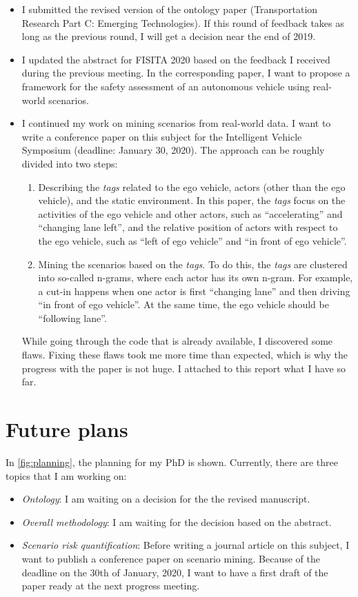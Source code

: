 \documentclass[10pt,final,a4paper,oneside,onecolumn]{article}
\begin{document}
\begin{itemize}
	\item I submitted the revised version of the ontology paper (Transportation Research Part C: Emerging Technologies). If this round of feedback takes as long as the previous round, I will get a decision near the end of 2019.
	\item I updated the abstract for FISITA 2020 based on the feedback I received during the previous meeting. In the corresponding paper, I want to propose a framework for the safety assessment of an autonomous vehicle using real-world scenarios.
	\item I continued my work on mining scenarios from real-world data. I want to write a conference paper on this subject for the Intelligent Vehicle Symposium (deadline: January 30, 2020). The approach can be roughly divided into two steps:
	\begin{enumerate}
		\item Describing the \emph{tags} related to the ego vehicle, actors (other than the ego vehicle), and the static environment. In this paper, the \emph{tags} focus on the activities of the ego vehicle and other actors, such as ``accelerating'' and ``changing lane left'', and the relative position of actors with respect to the ego vehicle, such as ``left of ego vehicle'' and ``in front of ego vehicle''.
		\item Mining the scenarios based on the \emph{tags}. To do this, the \emph{tags} are clustered into so-called n-grams, where each actor has its own n-gram. For example, a cut-in happens when one actor is first ``changing lane'' and then driving ``in front of ego vehicle''. At the same time, the ego vehicle should be ``following lane''.
	\end{enumerate}	
	While going through the code that is already available, I discovered some flaws. Fixing these flaws took me more time than expected, which is why the progress with the paper is not huge. I attached to this report what I have so far.
\end{itemize}

\section{Future plans}

In \cref{fig:planning}, the planning for my PhD is shown. Currently, there are three topics that I am working on:
\begin{itemize}
	\item \emph{Ontology}: I am waiting on a decision for the the revised manuscript.
	\item \emph{Overall methodology}: I am waiting for the decision based on the abstract.
	\item \emph{Scenario risk quantification}: Before writing a journal article on this subject, I want to publish a conference paper on scenario mining. Because of the deadline on the 30th of January, 2020, I want to have a first draft of the paper ready at the next progress meeting.
\end{itemize}
\end{document}
